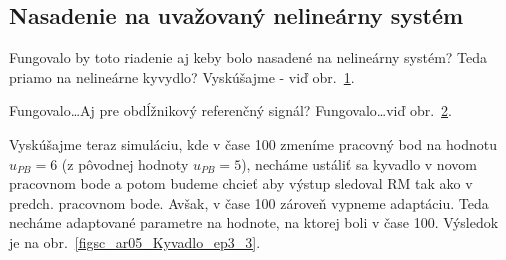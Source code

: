 \documentclass[a4paper, 10pt, ]{article}
\begin{document}
\subsection{Nasadenie na uvažovaný nelineárny systém}

Fungovalo by toto riadenie aj keby bolo nasadené na nelineárny systém? Teda priamo na nelineárne kyvydlo? Vyskúšajme - viď obr.~\ref{figsc_ar05_Kyvadlo_ep3_1}.





\begin{figure}[!b]
	\centering

    \vspace{-3mm}


    \vspace{-2mm}

	\caption{}
	\label{figsc_ar05_Kyvadlo_ep3_1}

    \vspace{-2mm}

\end{figure}




Fungovalo\ldots Aj pre obdĺžnikový referenčný signál? Fungovalo\ldots viď obr.~\ref{figsc_ar05_Kyvadlo_ep3_2}.



\begin{figure}[!t]
	\centering

    \vspace{-3mm}


    \vspace{-2mm}

	\caption{}
	\label{figsc_ar05_Kyvadlo_ep3_2}

    \vspace{-2mm}

\end{figure}





Vyskúšajme teraz simuláciu, kde v čase 100 zmeníme pracovný bod na hodnotu $u_{PB} = 6$ (z pôvodnej hodnoty $u_{PB} = 5$), necháme ustáliť sa kyvadlo v novom pracovnom bode a potom budeme chcieť aby výstup sledoval RM tak ako v predch. pracovnom bode. Avšak, v čase 100 zároveň vypneme adaptáciu. Teda necháme adaptované parametre na hodnote, na ktorej boli v čase 100. Výsledok je na obr.~\ref{figsc_ar05_Kyvadlo_ep3_3}.
\end{document}

